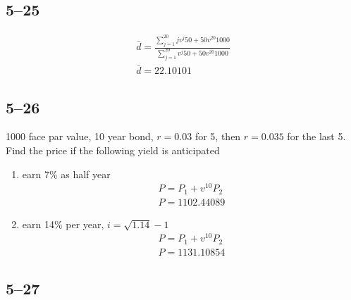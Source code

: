 \documentclass[a4paper, 12pt, reqno]{amsart}
\begin{document}
\subsection*{5--25}

\begin{equation}\nonumber
    \begin{gathered}
        \bar d = \frac{\sum_{j=1}^{20}j v^j 50 + 50 v^{20}1000}
            {\sum_{j=1}^{20}v^j 50 + 50 v^{20}1000}             \\
        \bar d = 22.10101
    \end{gathered}
\end{equation}

\subsection*{5--26}

1000 face par value, 10 year bond, $r=0.03$ for 5, then $r=0.035$ for the last
5. Find the price if the following yield is anticipated
\begin{enumerate}
    \item earn 7\% as half year
        \begin{equation}\nonumber
            \begin{gathered}
                P = P_1 + v^{10} P_2        \\
                P = 1102.44089
            \end{gathered}
        \end{equation}
    \item earn 14\% per year, $i = \sqrt{1.14} - 1$
        \begin{equation}\nonumber
            \begin{gathered}
                P = P_1 + v^{10} P_2        \\
                P = 1131.10854
            \end{gathered}
        \end{equation}
\end{enumerate}

\subsection*{5--27}
\end{document}

